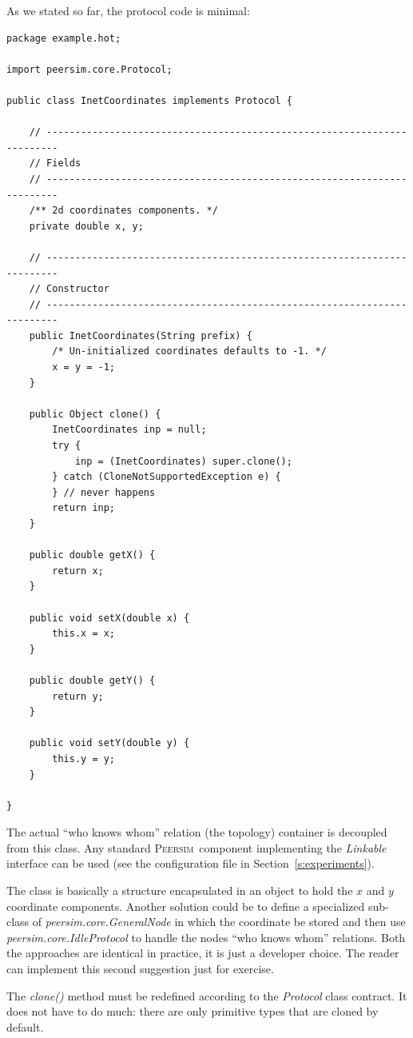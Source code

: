 \documentclass[a4paper,12pt]{article}
\newcommand{\id}[1]{{\scshape\small #1}}
\newcommand{\psim}{\id{Peersim}}
\begin{document}
As we stated so far, the protocol code is minimal:

\footnotesize
\begin{verbatim}
package example.hot;

import peersim.core.Protocol;

public class InetCoordinates implements Protocol {

    // ------------------------------------------------------------------------
    // Fields
    // ------------------------------------------------------------------------
    /** 2d coordinates components. */
    private double x, y;

    // ------------------------------------------------------------------------
    // Constructor
    // ------------------------------------------------------------------------
    public InetCoordinates(String prefix) {
        /* Un-initialized coordinates defaults to -1. */
        x = y = -1;
    }

    public Object clone() {
        InetCoordinates inp = null;
        try {
            inp = (InetCoordinates) super.clone();
        } catch (CloneNotSupportedException e) {
        } // never happens
        return inp;
    }

    public double getX() {
        return x;
    }

    public void setX(double x) {
        this.x = x;
    }

    public double getY() {
        return y;
    }

    public void setY(double y) {
        this.y = y;
    }

}
\end{verbatim}
\normalsize

The actual ``who knows whom'' relation (the topology) container is decoupled
from this class. Any standard \psim~component implementing the
\emph{Linkable} interface can be used (see the configuration file in
Section~\ref{s:experiments}). 

The class is basically a structure encapsulated in an
object to hold the $x$ and $y$ coordinate components. Another solution
could be to define a specialized sub-class of 
\emph{peersim.core.GeneralNode} in which the coordinate be stored
and then use \emph{peersim.core.IdleProtocol} to handle the nodes
``who knows whom'' relations. Both the approaches are identical in
practice, it is just a developer choice. The reader can implement this
second suggestion just for exercise.

The \emph{clone()} method must be redefined according to the
\emph{Protocol} class contract. It does not have to do much: there
are only primitive types that are cloned by default.
\end{document}
